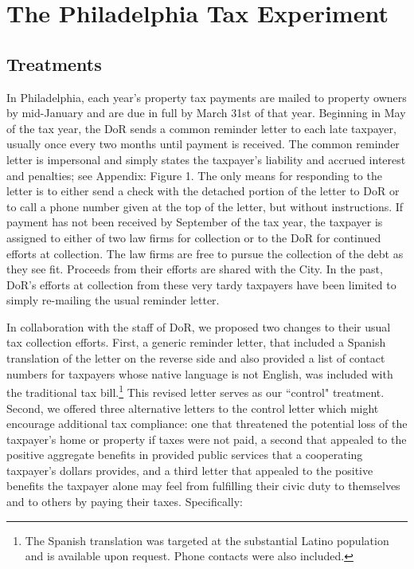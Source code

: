 \documentclass[12pt,titlepage]{article}
\begin{document}
\section{The Philadelphia Tax Experiment}

\subsection{Treatments}

In Philadelphia, each year's property tax payments are mailed to
property owners by mid-January and are due in full by March 31st of
that year.  Beginning in May of the tax year, the DoR sends a common
reminder letter to each late taxpayer, usually once every two months
until payment is received.  The common reminder letter is impersonal
and simply states the taxpayer's liability and accrued interest and
penalties; see Appendix: Figure 1.  The only means for responding to the letter
is to either send a check with the detached portion of the letter to
DoR or to call a phone number given at the top of the letter, but
without instructions.  If payment has not been received by September
of the tax year, the taxpayer is assigned
to either of two law firms for collection or to the DoR
for continued efforts at collection.  The law firms are free to pursue
the collection of the debt as they see fit.  Proceeds from their
efforts are shared with the City.  In the past, DoR's efforts at
collection from these very tardy taxpayers have been limited to simply
re-mailing the usual reminder letter.

In collaboration with the staff of DoR, we proposed two changes to
their usual tax collection efforts.  First, a generic reminder letter,
that included a Spanish translation of the letter on the reverse side
and also provided a list of contact numbers for taxpayers whose native
language is not English, was included with the traditional tax
bill.\footnote{The Spanish translation was targeted at the substantial
  Latino population and is available upon request. Phone contacts were
  also included.}  This revised letter serves as our ``control"
treatment.  Second, we offered three alternative letters to the
control letter which might encourage additional tax compliance: one
that threatened the potential loss of the taxpayer's home or property
if taxes were not paid, a second that appealed to the positive
aggregate benefits in provided public services that a cooperating
taxpayer's dollars provides, and a third letter that appealed to the
positive benefits the taxpayer alone may feel from fulfilling their
civic duty to themselves and to others by paying their
taxes. Specifically:
\end{document}
